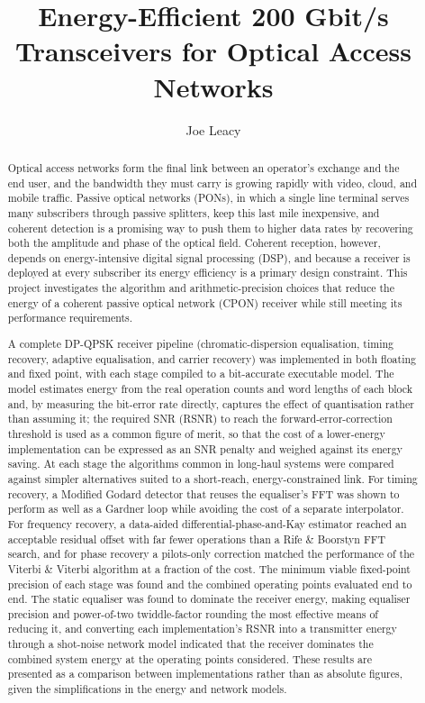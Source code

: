 \documentclass[12pt,a4paper]{report}
\title{Energy-Efficient 200 Gbit/s Transceivers for Optical Access Networks}
\author{Joe Leacy}
\begin{document}
\begin{abstract}
Optical access networks form the final link between an operator's exchange and the end user, and the bandwidth they must carry is growing rapidly with video, cloud, and mobile traffic. Passive optical networks (PONs), in which a single line terminal serves many subscribers through passive splitters, keep this last mile inexpensive, and coherent detection is a promising way to push them to higher data rates by recovering both the amplitude and phase of the optical field. Coherent reception, however, depends on energy-intensive digital signal processing (DSP), and because a receiver is deployed at every subscriber its energy efficiency is a primary design constraint. This project investigates the algorithm and arithmetic-precision choices that reduce the energy of a coherent passive optical network (CPON) receiver while still meeting its performance requirements.

A complete DP-QPSK receiver pipeline (chromatic-dispersion equalisation, timing recovery, adaptive equalisation, and carrier recovery) was implemented in both floating and fixed point, with each stage compiled to a bit-accurate executable model. The model estimates energy from the real operation counts and word lengths of each block and, by measuring the bit-error rate directly, captures the effect of quantisation rather than assuming it; the required SNR (RSNR) to reach the forward-error-correction threshold is used as a common figure of merit, so that the cost of a lower-energy implementation can be expressed as an SNR penalty and weighed against its energy saving. At each stage the algorithms common in long-haul systems were compared against simpler alternatives suited to a short-reach, energy-constrained link. For timing recovery, a Modified Godard detector that reuses the equaliser's FFT was shown to perform as well as a Gardner loop while avoiding the cost of a separate interpolator. For frequency recovery, a data-aided differential-phase-and-Kay estimator reached an acceptable residual offset with far fewer operations than a Rife \& Boorstyn FFT search, and for phase recovery a pilots-only correction matched the performance of the Viterbi \& Viterbi algorithm at a fraction of the cost. The minimum viable fixed-point precision of each stage was found and the combined operating points evaluated end to end. The static equaliser was found to dominate the receiver energy, making equaliser precision and power-of-two twiddle-factor rounding the most effective means of reducing it, and converting each implementation's RSNR into a transmitter energy through a shot-noise network model indicated that the receiver dominates the combined system energy at the operating points considered. These results are presented as a comparison between implementations rather than as absolute figures, given the simplifications in the energy and network models.
\end{abstract}
\end{document}
